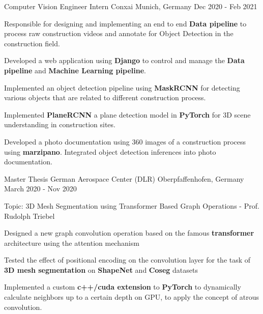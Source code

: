 \begin{cventries}
  \cventry
  {Computer Vision Engineer Intern} %
  {Conxai} %
  {Munich, Germany} %
  {Dec 2020 - Feb 2021} %
  {
  \begin{cvitems} %
    \item {Responsible for designing and implementing an end to end \textbf{Data
      pipeline} to process raw construction videos and annotate for Object Detection in the
      construction field.}
    \item {Developed a web application using \textbf{Django} to control and
    manage the \textbf{Data pipeline} and \textbf{Machine Learning pipeline}.}
    \item {Implemented an object detection pipeline using \textbf{MaskRCNN} for
    detecting various objects that are related to different construction
    process.}
    \item {Implemented \textbf{PlaneRCNN} a plane detection model in
    \textbf{PyTorch} for 3D scene understanding in construction sites.}
    \item {Developed a photo documentation using 360 images of a construction
    process using \textbf{marzipano}. Integrated object detection inferences into photo documentation. }
  \end{cvitems}
  }

  \cventry
  {Master Thesis} %
  {German Aerospace Center (DLR)} %
  {Oberpfaffenhofen, Germany} %
  {March 2020 - Nov 2020} %
  {
  \begin{cvitems} %
    \item {Topic: 3D Mesh Segmentation using Transformer Based Graph Operations - Prof. Rudolph Triebel}
    \item {Designed a new graph convolution operation based on the famous
    \textbf{transformer} architecture using the attention mechanism}
    \item {Tested the effect of positional encoding on the convolution layer for
    the task of \textbf{3D mesh segmentation} on \textbf{ShapeNet} and
    \textbf{Coseg} datasets}
    \item {Implemented a custom \textbf{c++/cuda extension} to \textbf{PyTorch}
    to dynamically calculate neighbors up to a certain depth on GPU, to apply
    the concept of atrous convolution.}
  \end{cvitems}
  }


\end{cventries}
